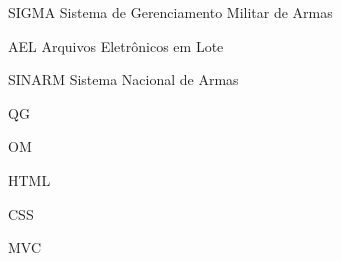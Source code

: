 \begin{siglas}
  \item[SIGMA] Sistema de Gerenciamento Militar de Armas
  \item[AEL] Arquivos Eletrônicos em Lote 
  \item[SINARM] Sistema Nacional de Armas 
  \item[QG] 
  \item[OM] 
  \item[HTML]
  \item[CSS]  
  \item[MVC] 
  
\end{siglas}